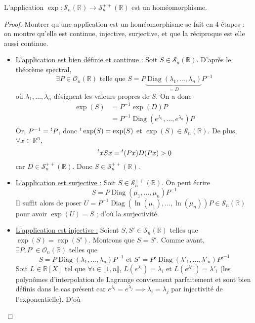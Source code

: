   \begin{theorem}
    L'application $\exp : \mathcal{S}_n(\mathbb{R}) \rightarrow \mathcal{S}^{++}_n(\mathbb{R})$ est un homéomorphisme.
  \end{theorem}

  \begin{proof}
    Montrer qu'une application est un homéomorphisme se fait en $4$ étapes : on montre qu'elle est continue, injective, surjective, et que la réciproque est elle aussi continue.
    \begin{itemize}
      \item \uline{L'application est bien définie et continue :} Soit $S \in \mathcal{S}_n(\mathbb{R})$. D'après le théorème spectral,
      \[ \exists P \in \mathcal{O}_n(\mathbb{R}) \text{ telle que } S = P \underbrace{\operatorname{Diag}(\lambda_1, \dots, \lambda_n)}_{= D}P^{-1} \]
      où $\lambda_1, \dots, \lambda_n$ désignent les valeurs propres de $S$. On a donc
      \begin{align*}
        \exp(S) &= P^{-1} \exp(D) P \\
        &= P^{-1} \operatorname{Diag}(e^{\lambda_1}, \dots, e^{\lambda_n}) P
      \end{align*}
      Or, $P^{-1} = \mathstrut ^t P$, donc $\mathstrut ^t \exp(S) = \exp(S)$ et $\exp(S) \in \mathcal{S}_n(\mathbb{R})$. De plus, $\forall x \in \mathbb{R}^n$,
      \[ \mathstrut ^t x S x = \mathstrut ^t (Px) D (Px) > 0 \]
      car $D \in \mathcal{S}^{++}_n(\mathbb{R})$. Donc $S \in \mathcal{S}^{++}_n(\mathbb{R})$.
      \item \uline{L'application est surjective :} Soit $S \in \mathcal{S}^{++}_n(\mathbb{R})$. On peut écrire
      \[ S = P \operatorname{Diag}(\mu_1, \dots, \mu_n) P^{-1} \]
      Il suffit alors de poser $U = P^{-1} \operatorname{Diag}(\ln(\mu_1), \dots, \ln(\mu_n)) P \in \mathcal{S}_n(\mathbb{R})$ pour avoir $\exp(U) = S$ ; d'où la surjectivité.
      \item \uline{L'application est injective :} Soient $S, S' \in \mathcal{S}_n(\mathbb{R})$ telles que $\exp(S) = \exp(S')$. Montrons que $S = S'$. Comme avant, $\exists P, P' \in \mathcal{O}_n(\mathbb{R})$ telles que
      \[ S = P \operatorname{Diag}(\lambda_1, \dots, \lambda_n) P^{-1} \text{ et } S' = P' \operatorname{Diag}(\lambda'_1, \dots, \lambda'_n) P'^{-1} \]
      Soit $L \in \mathbb{R}[X]$ tel que $\forall i \in \llbracket 1, n \rrbracket$, $L(e^{\lambda_i}) = \lambda_i$ et $L(e^{\lambda'_i}) = \lambda'_i$ (les polynômes d'interpolation de Lagrange conviennent parfaitement et sont bien définis dans le cas présent car $e^{\lambda_i} = e^{\lambda_j} \implies \lambda_i = \lambda_j$ par injectivité de l'exponentielle). D'où

\end{itemize}
\end{proof}
